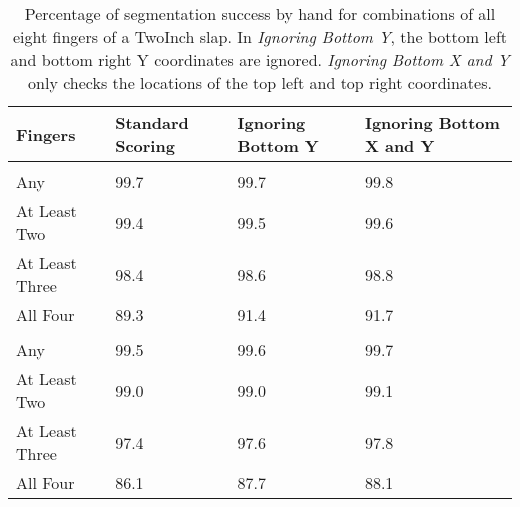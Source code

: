 \documentclass[]{article}
\begin{document}
\begin{table}[!h]

\caption{\label{tab:twoinch-per-hand-all}Percentage of segmentation success by hand for combinations of all eight fingers of a TwoInch slap. In \textit{Ignoring Bottom Y}, the bottom left and bottom right Y coordinates are ignored. \textit{Ignoring Bottom X and Y} only checks the locations of the top left and top right coordinates.}
\centering
\begin{tabular}{llll}
\toprule
Fingers & Standard Scoring & Ignoring Bottom Y & Ignoring Bottom X and Y\\
\midrule
\addlinespace[0.3em]
\multicolumn{4}{l}{\textbf{Right}}\\
\rowcolor{gray!6}  \hspace{1em}Any & 99.7 & 99.7 & 99.8\\
\hspace{1em}At Least Two & 99.4 & 99.5 & 99.6\\
\rowcolor{gray!6}  \hspace{1em}At Least Three & 98.4 & 98.6 & 98.8\\
\hspace{1em}All Four & 89.3 & 91.4 & 91.7\\
\addlinespace[0.3em]
\multicolumn{4}{l}{\textbf{Left}}\\
\rowcolor{gray!6}  \hspace{1em}Any & 99.5 & 99.6 & 99.7\\
\hspace{1em}At Least Two & 99.0 & 99.0 & 99.1\\
\rowcolor{gray!6}  \hspace{1em}At Least Three & 97.4 & 97.6 & 97.8\\
\hspace{1em}All Four & 86.1 & 87.7 & 88.1\\
\bottomrule
\end{tabular}
\end{table}
\end{document}
